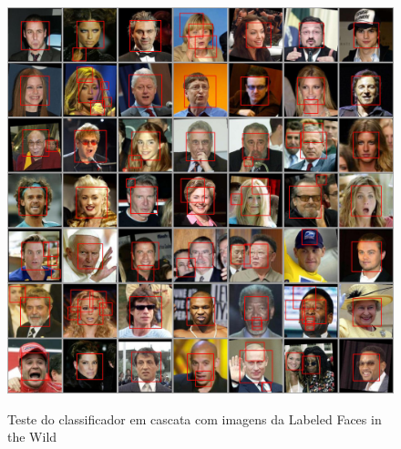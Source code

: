 \begin{figure}[htbp]
    \caption{Teste do classificador em cascata com imagens da Labeled Faces in the Wild}
    \label{fig:detector_facial_lfw}
    \begin{center}
        {\includegraphics[width=0.95\linewidth]{imagens/detector_facial_lfw.jpg}}
    \end{center}
\end{figure}